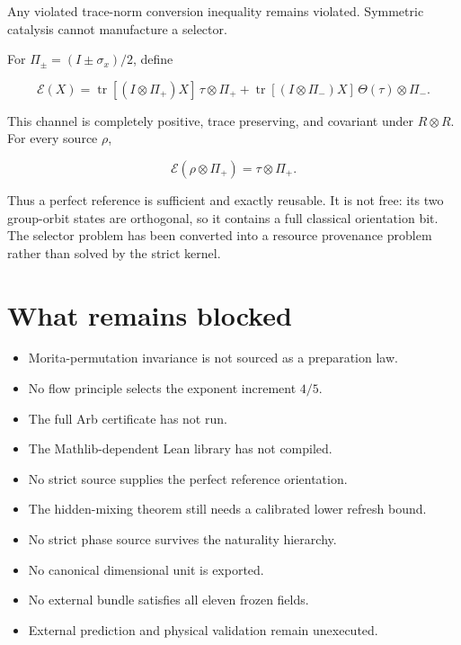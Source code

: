\documentclass[11pt,a4paper,openany]{report}
\begin{document}
Any violated trace-norm conversion inequality remains violated. Symmetric catalysis cannot manufacture a selector.

For \(\Pi_\pm=(I\pm\sigma_x)/2\), define

\[
\mathcal E(X)=
\operatorname{tr}[(I\otimes\Pi_+)X]\,\tau\otimes\Pi_+
+
\operatorname{tr}[(I\otimes\Pi_-)X]\,\Theta(\tau)\otimes\Pi_-.
\]

This channel is completely positive, trace preserving, and covariant under \(R\otimes R\). For every source \(\rho\),

\[
\mathcal E(\rho\otimes\Pi_+)=\tau\otimes\Pi_+.
\]

Thus a perfect reference is sufficient and exactly reusable. It is not free: its two group-orbit states are orthogonal, so it contains a full classical orientation bit. The selector problem has been converted into a resource provenance problem rather than solved by the strict kernel.

\section{What remains blocked}

\begin{itemize}
\item 
Morita-permutation invariance is not sourced as a preparation law.

\item 
No flow principle selects the exponent increment \(4/5\).

\item 
The full Arb certificate has not run.

\item 
The Mathlib-dependent Lean library has not compiled.

\item 
No strict source supplies the perfect reference orientation.

\item 
The hidden-mixing theorem still needs a calibrated lower refresh bound.

\item 
No strict phase source survives the naturality hierarchy.

\item 
No canonical dimensional unit is exported.

\item 
No external bundle satisfies all eleven frozen fields.

\item 
External prediction and physical validation remain unexecuted.

\end{itemize}
\end{document}
